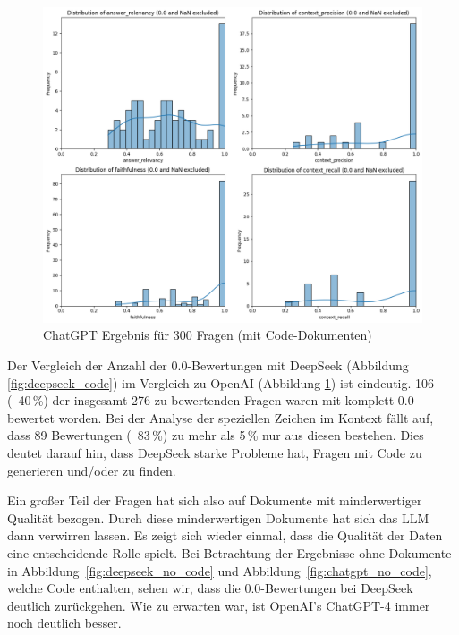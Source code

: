 \begin{figure}[!ht]
    \centering
    \includegraphics[width=1\textwidth]{images/127_44_code_invest_O_O}
    \caption[ChatGPT Metriken für 300 Fragen]{ChatGPT Ergebnis für 300 Fragen (mit Code-Dokumenten)}
    \label{fig:chatgpt_code}
\end{figure}
Der Vergleich der Anzahl der 0.0-Bewertungen mit DeepSeek (Abbildung \ref{fig:deepseek_code}) im Vergleich zu OpenAI (Abbildung \ref{fig:chatgpt_code}) ist eindeutig.
106 (~40\,\%) der insgesamt 276 zu bewertenden Fragen waren mit komplett 0.0 bewertet worden. Bei der Analyse der speziellen Zeichen im Kontext fällt auf, dass 89 Bewertungen (~83\,\%) zu mehr als 5\,\% nur aus diesen bestehen. Dies deutet darauf hin, dass DeepSeek starke Probleme hat, Fragen mit Code zu generieren und/oder zu finden.

Ein großer Teil der Fragen hat sich also auf Dokumente mit minderwertiger Qualität bezogen. Durch diese minderwertigen Dokumente hat sich das LLM dann verwirren lassen.
Es zeigt sich wieder einmal, dass die Qualität der Daten eine entscheidende Rolle spielt.
Bei Betrachtung der Ergebnisse ohne Dokumente in Abbildung~\ref{fig:deepseek_no_code} und Abbildung~\ref{fig:chatgpt_no_code}, welche Code enthalten, sehen wir, dass die 0.0-Bewertungen bei DeepSeek deutlich zurückgehen.
Wie zu erwarten war, ist OpenAI's ChatGPT-4 immer noch deutlich besser.

